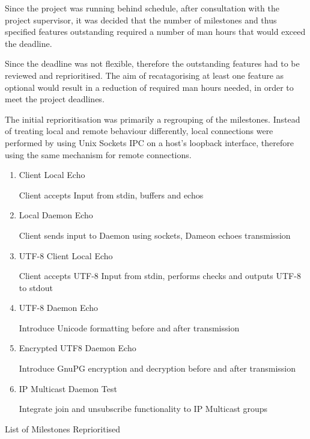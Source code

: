 
Since the project was running behind schedule, after consultation with
the project supervisor, it was decided that the number of milestones and
thus specified features outstanding required a number of man hours that
would exceed the deadline.


Since the deadline was not flexible, therefore the outstanding
features had to be reviewed and reprioritised. The aim of
recatagorising at least one feature as optional would result in a
reduction of required man hours needed, in order to meet the project
deadlines.


The initial reprioritisation was primarily a regrouping of the
milestones. Instead of treating local and remote behaviour differently,
local connections were performed by using Unix Sockets IPC on a host's
loopback interface, therefore using the same mechanism for remote
connections.

\begin{table}[Hbt]

\begin{center}

\begin{enumerate}

\item Client Local Echo 

	\subitem Client accepts Input from stdin, buffers and echos

\item Local Daemon Echo 

	\subitem Client sends input to Daemon using sockets, Dameon 
	echoes transmission

\item UTF-8 Client Local Echo 

	\subitem Client accepts UTF-8 Input from stdin, performs checks and
	outputs UTF-8 to stdout

\item UTF-8 Daemon Echo

	\subitem Introduce Unicode formatting before and after transmission 

\item Encrypted UTF8 Daemon Echo 

	\subitem Introduce GnuPG encryption and decryption before and after 
	transmission 

\item IP Multicast Daemon Test

	\subitem Integrate join and unsubscribe functionality to IP Multicast
	groups

\end{enumerate}

\end{center}

\caption{List of Milestones Reprioritised}

\end{table}


